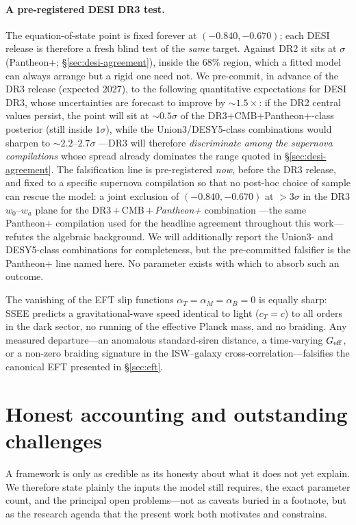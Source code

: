 \documentclass[aps,prd,preprint,amsmath,amssymb,nofootinbib,longbibliography]{revtex4-2}
\begin{document}
\paragraph{A pre-registered DESI DR3 test.} The equation-of-state point is
fixed forever at $(-0.840,-0.670)$; each DESI release is therefore a fresh
blind test of the \emph{same} target. Against DR2 it sits at $\val{p2_w0wa_ssee_ec26}\sigma$
(Pantheon+; \S\ref{sec:desi-agreement}), inside the $68\%$ region, which a fitted
model can always arrange but a rigid one need not. We pre-commit, in advance of the DR3 release (expected
2027), to the following quantitative expectations for
DESI DR3, whose uncertainties are forecast to improve by ${\sim}1.5\times$:
if the DR2 central values persist, the point will sit at ${\sim}0.5\sigma$ of
the DR3$+$CMB$+$Pantheon+-class posterior (still inside $1\sigma$), while the
Union3/DESY5-class combinations would sharpen to ${\sim}2.2$--$2.7\sigma$
---DR3 will therefore \emph{discriminate among the supernova compilations}
whose spread already dominates the range quoted in \S\ref{sec:desi-agreement}.
The falsification line is pre-registered \emph{now}, before the DR3 release, and
fixed to a specific supernova compilation so that no post-hoc choice of sample can
rescue the model: a joint exclusion of $(-0.840,-0.670)$ at ${>}3\sigma$ in the
DR3 $w_0$--$w_a$ plane for the DR3\,$+$\,CMB\,$+$\,\emph{Pantheon+} combination
---the same Pantheon+ compilation used for the headline agreement throughout this
work---refutes the algebraic background. We will additionally report the
Union3- and DESY5-class combinations for completeness, but the pre-committed
falsifier is the Pantheon+ line named here. No parameter exists with which
to absorb such an outcome.

The vanishing of the EFT slip functions $\alpha_T=\alpha_M=\alpha_B=0$ is
equally sharp: SSEE predicts a gravitational-wave speed identical to light
($c_T=c$) to all orders in the dark sector, no running of the effective Planck
mass, and no braiding. Any measured departure---an anomalous standard-siren
distance, a time-varying $G_{\rm eff}$, or a non-zero braiding signature in the
ISW--galaxy cross-correlation---falsifies the canonical EFT presented in
\S\ref{sec:eft}.

\section{Honest accounting and outstanding challenges}
\label{sec:open}

A framework is only as credible as its honesty about what it does not yet
explain. We therefore state plainly the inputs the model still requires, the
exact parameter count, and the principal open problems---not as caveats buried
in a footnote, but as the research agenda that the present work both motivates
and constrains.
\end{document}
